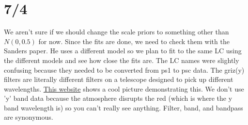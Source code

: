 \documentclass[12pt]{article}
\begin{document}
\section{7/4}
We aren't sure if we should change the scale priors to something other than $N(0, 0.5)$ for now. Since the fits are done, we need to check them with the Sanders paper. He uses a different model so we plan to fit to the same LC using the different models and see how close the fits are. The LC names were slightly confusing because they needed to be converted from ps1 to psc data. The griz(y) filters are literally different filters on a telescope designed to pick up different wavelengths. \href{http://svo2.cab.inta-csic.es/svo/theory/fps3/index.php?mode=browse&gname=PAN-STARRS&asttype=}{This website} shows a cool picture demonstrating this. We don't use 'y' band data because the atmosphere disrupts the red (which is where the y band wavelength is) so you can't really see anything. Filter, band, and bandpass are synonymous. 
\end{document}
